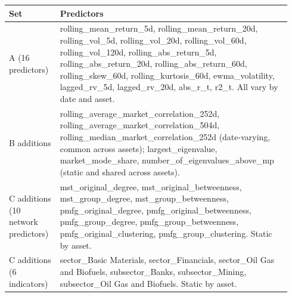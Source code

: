 \begin{center}
\label{tab:forecast_feature_inventory}
\small
\begin{tabular}{p{0.17\linewidth}p{0.77\linewidth}}
\toprule
Set & Predictors \\
\midrule
A (16 predictors) & rolling\_\allowbreak mean\_\allowbreak return\_\allowbreak 5d, rolling\_\allowbreak mean\_\allowbreak return\_\allowbreak 20d, rolling\_\allowbreak vol\_\allowbreak 5d, rolling\_\allowbreak vol\_\allowbreak 20d, rolling\_\allowbreak vol\_\allowbreak 60d, rolling\_\allowbreak vol\_\allowbreak 120d, rolling\_\allowbreak abs\_\allowbreak return\_\allowbreak 5d, rolling\_\allowbreak abs\_\allowbreak return\_\allowbreak 20d, rolling\_\allowbreak abs\_\allowbreak return\_\allowbreak 60d, rolling\_\allowbreak skew\_\allowbreak 60d, rolling\_\allowbreak kurtosis\_\allowbreak 60d, ewma\_\allowbreak volatility, lagged\_\allowbreak rv\_\allowbreak 5d, lagged\_\allowbreak rv\_\allowbreak 20d, abs\_\allowbreak r\_\allowbreak t, r2\_\allowbreak t. All vary by date and asset. \\
B additions & rolling\_\allowbreak average\_\allowbreak market\_\allowbreak correlation\_\allowbreak 252d, rolling\_\allowbreak average\_\allowbreak market\_\allowbreak correlation\_\allowbreak 504d, rolling\_\allowbreak median\_\allowbreak market\_\allowbreak correlation\_\allowbreak 252d (date-varying, common across assets); largest\_\allowbreak eigenvalue, market\_\allowbreak mode\_\allowbreak share, number\_\allowbreak of\_\allowbreak eigenvalues\_\allowbreak above\_\allowbreak mp (static and shared across assets). \\
C additions (10 network predictors) & mst\_\allowbreak original\_\allowbreak degree, mst\_\allowbreak original\_\allowbreak betweenness, mst\_\allowbreak group\_\allowbreak degree, mst\_\allowbreak group\_\allowbreak betweenness, pmfg\_\allowbreak original\_\allowbreak degree, pmfg\_\allowbreak original\_\allowbreak betweenness, pmfg\_\allowbreak group\_\allowbreak degree, pmfg\_\allowbreak group\_\allowbreak betweenness, pmfg\_\allowbreak original\_\allowbreak clustering, pmfg\_\allowbreak group\_\allowbreak clustering. Static by asset. \\
C additions (6 indicators) & sector\_\allowbreak Basic Materials, sector\_\allowbreak Financials, sector\_\allowbreak Oil Gas and Biofuels, subsector\_\allowbreak Banks, subsector\_\allowbreak Mining, subsector\_\allowbreak Oil Gas and Biofuels. Static by asset. \\
\bottomrule
\end{tabular}
\end{center}

